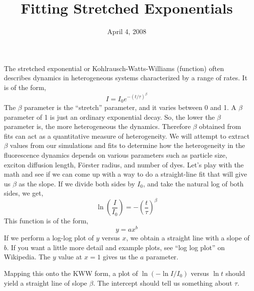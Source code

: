 \documentclass[12pt]{article}
\title{Fitting Stretched Exponentials}
\date{April 4, 2008}
\begin{document}
\maketitle

The stretched exponential or Kohlrausch-Watts-Williams (function)
often describes dynamics in heterogeneous systems characterized by a
range of rates.  It is of the form,
%
$$
I = I_0 e^{-(t/\tau)^\beta}
$$
%
The $\beta$ parameter is the ``stretch'' parameter, and it varies
between 0 and 1.  A $\beta$ parameter of 1 is just an ordinary
exponential decay.  So, the lower the $\beta$ parameter is, the more
heterogeneous the dynamics.  Therefore $\beta$ obtained from fits can
act as a quantitative measure of heterogeneity.  We will attempt to
extract $\beta$ values from our simulations and fits to determine how
the heterogeneity in the fluorescence dynamics depends on various
parameters such as particle size, exciton diffusion length, F\" orster
radius, and number of dyes.  Let's play with the math and see if we
can come up with a way to do a straight-line fit that will give us
$\beta$ as the slope.  If we divide both sides by $I_0$, and take the
natural log of both sides, we get,
%
$$
\ln \left( \frac{I}{I_0} \right) = - \left( \frac{t}{\tau}
\right)^\beta
$$
%
This function is of the form,
%
$$
y = a x^b
$$
%
If we perform a log-log plot of $y$ versus $x$, we obtain a straight
line with a slope of $b$.  If you want a little more detail and
example plots, see ``log log plot'' on Wikipedia.  The $y$ value at
$x=1$ gives us the $a$ parameter.

Mapping this onto the KWW form, a plot of $\ln (- \ln I/I_0)$ versus
$\ln t$ should yield a straight line of slope $\beta$.  The intercept
should tell us something about $\tau$.
\end{document}

